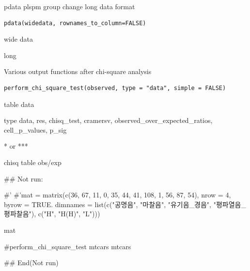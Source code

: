 \documentclass[a4paper]{book}
\begin{document}
%
\begin{Description}
pdata plspm group change long data format
\end{Description}
%
\begin{Usage}
\begin{verbatim}
pdata(widedata, rownames_to_column=FALSE)
\end{verbatim}
\end{Usage}
%
\begin{Arguments}
\begin{ldescription}
\item[\code{data}] wide data
\end{ldescription}
\end{Arguments}
%
\begin{Value}
long
\end{Value}
%
\begin{Description}
Various output functions after chi-square analysis
\end{Description}
%
\begin{Usage}
\begin{verbatim}
perform_chi_square_test(observed, type = "data", simple = FALSE)
\end{verbatim}
\end{Usage}
%
\begin{Arguments}
\begin{ldescription}
\item[\code{observed}] table data

\item[\code{type}] type data, res, chisq\_test, cramersv, observed\_over\_expected\_ratios, cell\_p\_values, p\_sig

\item[\code{simple}] * or ***
\end{ldescription}
\end{Arguments}
%
\begin{Value}
chisq table obs/exp
\end{Value}
%
\begin{Examples}
\begin{ExampleCode}

## Not run: 

#' #'mat = matrix(c(36, 67, 11,
          0, 35, 44,
         41, 108, 1,
          56, 87, 54),
           nrow = 4, byrow = TRUE.
   dimnames = list(c("공명음", "마찰음",
     "유기음_경음", "평파열음_평파찰음"),  c("H", "H(H)", "L")))

 mat %

 #perform_chi_square_test
mtcars%
mtcars%

## End(Not run)

\end{ExampleCode}
\end{Examples}
\end{document}
